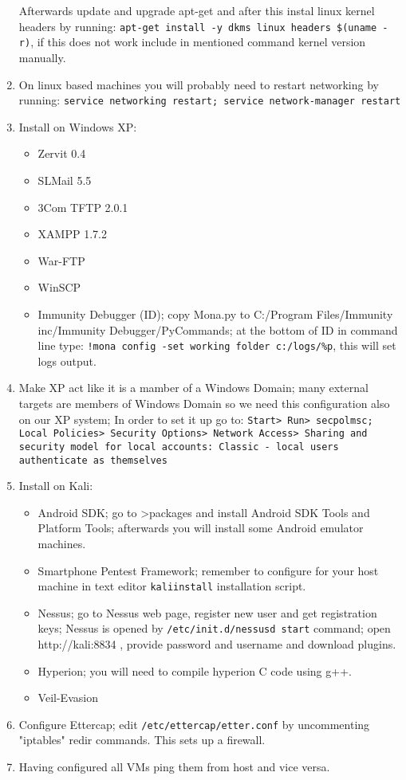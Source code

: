 \documentclass{article}[12pt]
\begin{document}
\begin{enumerate}
{Afterwards update and upgrade apt-get and after this instal linux kernel headers by running:
\texttt{apt-get install -y dkms linux headers \$(uname -r)},  \newline
if this does not work include in mentioned command kernel version manually.
}
\item{On linux based machines you will probably need to restart networking by running: \texttt{service networking restart; service network-manager restart}}
\item{Install on Windows XP:}
\begin{itemize}
\item{Zervit 0.4}
\item{SLMail 5.5}
\item{3Com TFTP 2.0.1}
\item{XAMPP 1.7.2}
\item{War-FTP}
\item{WinSCP}
\item{Immunity Debugger (ID); copy Mona.py to C:/Program Files/Immunity inc/Immunity Debugger/PyCommands; at the bottom of ID
in command line type: \texttt{!mona config -set working folder c:/logs/\%p}, this will set logs output.}

\end{itemize}
\item{Make XP act like it is a mamber of a Windows Domain; many external targets are members of Windows Domain so we need this configuration
also on our XP system; In order to set it up go to: \texttt{Start> Run> secpolmsc; Local Policies> Security Options> Network Access> Sharing and security model for local accounts:
Classic - local users authenticate as themselves}}

\item{Install on Kali:}


\begin{itemize}
\item{Android SDK; go to >packages and install Android SDK Tools and Platform Tools; afterwards you will install some Android emulator machines.}
\item{Smartphone Pentest Framework; remember to configure for your host machine in text editor \texttt{kaliinstall} installation script.}
\item{Nessus; go to Nessus web page, register new user and get registration keys; Nessus is opened by
\texttt{/etc/init.d/nessusd start} command; open http://kali:8834 , provide password and username and download plugins.}
\item{Hyperion; you will need to compile hyperion C code using g++.}
\item{Veil-Evasion}
\end{itemize}
\item{Configure Ettercap; edit \texttt{/etc/ettercap/etter.conf} by uncommenting "iptables" redir commands. This sets up a firewall.}
\item{Having configured all VMs ping them from host and vice versa.}
\end{enumerate}
\end{document}
